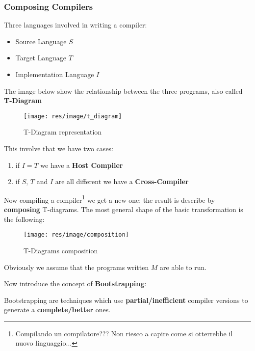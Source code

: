 \subsubsection{Composing Compilers}
Three languages involved in writing a compiler:
\begin{itemize}
\item Source Language $S$
\item Target Language $T$
\item Implementation Language $I$
\end{itemize}

The image below show the relationship between the three programs, also called
\textbf{T-Diagram}

\begin{figure}[ht]
\begin{center}
\texttt{[image: res/image/t\_diagram]}
\caption{T-Diagram representation}
\label{t-diagram_representation}
\end{center}
\end{figure}

This involve that we have two cases:
\begin{enumerate}
\item if $I = T$ we have a \textbf{Host Compiler}
\item if $S$, $T$ and $I$ are all different we have a \textbf{Cross-Compiler}
\end{enumerate}

Now compiling a compiler\footnote{Compilando un compilatore??? Non riesco a
capire come si otterrebbe il nuovo linguaggio...} we get a new one: the result
is describe by \textbf{composing} T-diagrams. The most general shape of the
basic transformation is the following:

\begin{figure}[H]
\begin{center}
\texttt{[image: res/image/composition]}
\caption{T-Diagrams composition}
\label{t-diagrams_composition}
\end{center}
\end{figure}

Obviously we assume that the programs written $M$ are able to run.

Now introduce the concept of \textbf{Bootstrapping}:

\begin{definition}
Bootstrapping are techniques which use \textbf{partial/inefficient} compiler
versions to generate a \textbf{complete/better} ones.
\end{definition}

